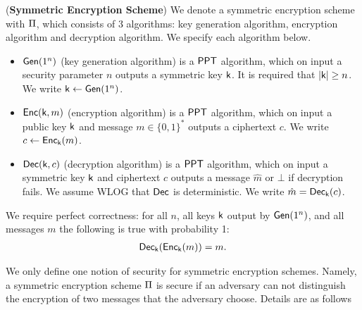 \begin{defn}
(\textbf{Symmetric Encryption Scheme}) We denote a symmetric encryption scheme with $\operatorname{\Pi}$, which consists of 3 algorithms: key generation algorithm, encryption algorithm and decryption algorithm. We specify each algorithm below. 
\begin{itemize}
	\itemsep-0.1em
	\item $\operatorname{\mathsf{Gen}}(1^n)$ (key generation algorithm) is a $\mathsf{PPT}$ algorithm, which on input a security parameter $n$ outputs a symmetric key $\mathsf{k}$. It is required that $\vert \mathsf{k}\vert \geq n$. We write $\mathsf{k}\leftarrow\operatorname{\mathsf{Gen}}(1^n)$. 
	\item $\operatorname{\mathsf{Enc}}(\mathsf{k},m)$ (encryption algorithm) is a $\mathsf{PPT}$ algorithm, which on input a public key $\mathsf{k}$ and message $m\in\{0,1\}^*$ outputs a ciphertext $c$. We write $c\leftarrow\operatorname{\mathsf{Enc}}_{\mathsf{k}}(m)$.
	\item $\operatorname{\mathsf{Dec}}(\mathsf{k},c)$ (decryption algorithm) is a $\mathsf{PPT}$ algorithm, which on input a symmetric key $\mathsf{k}$ and ciphertext $c$ outputs a message $\hat{m}$ or $\bot$ if decryption fails. We assume WLOG that $\operatorname{\mathsf{Dec}}$ is deterministic. We write $\hat{m} = \operatorname{\mathsf{Dec}}_{\mathsf{k}}(c)$.
\end{itemize}
We require perfect correctness: for all $n$, all keys $\mathsf{k}$ output by $\operatorname{\mathsf{Gen}}(1^n)$, and all messages $m$ the following is true with probability 1: 
\begin{align*}
	\operatorname{\mathsf{Dec}}_{\mathsf{k}}(\operatorname{\mathsf{Enc}}_{\mathsf{k}}(m))=m.
\end{align*} 
\end{defn}

We only define one notion of security for symmetric encryption schemes. Namely, a symmetric encryption scheme $\operatorname{\Pi}$ is secure if an adversary can not distinguish the encryption of two messages that the adversary choose. Details are as follows


